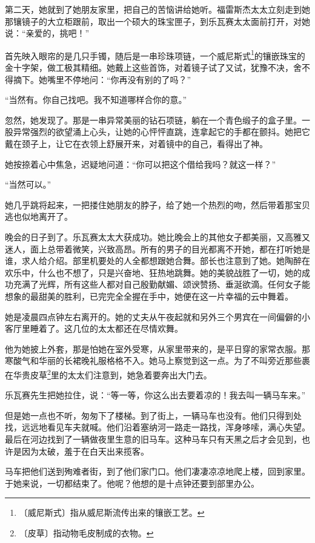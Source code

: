 \documentclass[12pt,UTF-8,openany]{ctexbook}
\begin{document}
\begin{large}
    第二天，她就到了她朋友家里，把自己的苦恼讲给她听。福雷斯杰太太立刻走到她那镶镜子的大立柜跟前，取出一个硕大的珠宝匣子，到乐瓦赛太太面前打开，对她说：“亲爱的，挑吧！”
    
    首先映入眼帘的是几只手镯，随后是一串珍珠项链，一个威尼斯式\footnote{〔威尼斯式〕指从威尼斯流传出来的镶嵌工艺。}的镶嵌珠宝的金十字架，做工极其精细。她戴上这些首饰，对着镜子试了又试，犹豫不决，舍不得摘下。她嘴里不停地问：“你再没有别的了吗？”
    
    “当然有。你自己找吧。我不知道哪样合你的意。”
    
    忽然，她发现了。那是一串异常美丽的钻石项链，躺在一个青色缎子的盒子里。一股异常强烈的欲望涌上心头，让她的心怦怦直跳，连拿起它的手都在颤抖。她把它戴在颈子上，让它在衣领上舒展开来，对着镜中的自己，看得出了神。
    
    她按捺着心中焦急，迟疑地问道：“你可以把这个借给我吗？就这一样？”
    
    “当然可以。”
    
    她几乎跳将起来，一把搂住她朋友的脖子，给了她一个热烈的吻，然后带着那宝贝逃也似地离开了。
    
    晚会的日子到了。乐瓦赛太太大获成功。她比晚会上的其他女子都美丽，又高雅又迷人，面上总带着微笑，兴致高昂。所有的男子的目光都离不开她，都在打听她是谁，求人给介绍。部里机要处的人全都想跟她合舞。部长也注意到了她。她陶醉在欢乐中，什么也不想了，只是兴奋地、狂热地跳舞。她的美貌战胜了一切，她的成功充满了光辉，所有这些人都对自己殷勤献媚、颂谀赞扬、垂涎欲滴。任何女子能想象的最甜美的胜利，已完完全全握在手中，她便在这一片幸福的云中舞着。
    
    她是凌晨四点钟左右离开的。她的丈夫从午夜起就和另外三个男宾在一间偏僻的小客厅里睡着了。这几位的太太都还在尽情欢舞。
    
    他为她披上外套，那是怕她在室外受寒，从家里带来的，是平日穿的家常衣服。那寒酸气和华丽的长裙晚礼服格格不入。她马上察觉到这一点。为了不叫旁近那些裹在华贵皮草\footnote{〔皮草〕指动物毛皮制成的衣物。}里的太太们注意到，她急着要奔出大门去。
    
    乐瓦赛先生把她拉住，说：“等一等，你这么出去要着凉的！我去叫一辆马车来。”
    
    但是她一点也不听，匆匆下了楼梯。到了街上，一辆马车也没有。他们只得到处找，远远地看见车夫就喊。他们沿着塞纳河一路走一路找，浑身哆嗦，满心失望。最后在河边找到了一辆做夜里生意的旧马车。这种马车只有天黑之后才会见到，也许是因为太破，羞于在白天出来揽客。
    
    马车把他们送到殉难者街，到了他们家门口。他们凄凄凉凉地爬上楼，回到家里。于她来说，一切都结束了。他呢？他想的是十点钟还要到部里办公。
    

\end{large}
\end{document}
